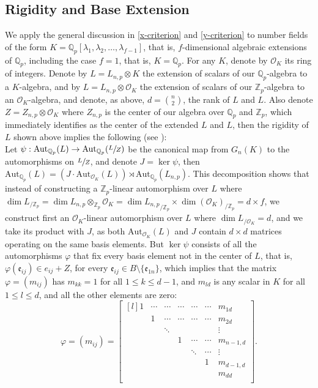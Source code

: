 \documentclass{article}
\newcommand{\e}{\mathfrak{e}}
\begin{document}
\subsection{Rigidity and Base Extension}
We apply the general discussion in \ref{x-criterion} and \ref{y-criterion} to number fields of the form $K=\mathbb{Q}_p[\lambda_1,\lambda_2,\dots,\lambda_{f-1}]$, that is, $f$-dimensional algebraic extensions of $\mathbb{Q}_p$, including the case $f=1$, that is, $K=\mathbb{Q}_p$. 
For any $K$, denote by $\mathcal{O}_K$ its ring of integers.
Denote by ${L}={L}_{n,p}\otimes{K}$ the extension of scalars of our $\mathbb{Q}_p$-algebra to a $K$-algebra, and by $L=L_{n,p}\otimes\mathcal{O}_K$ the extension of scalars of our $\mathbb{Z}_p$-algebra to an $\mathcal{O}_K$-algebra, and denote, as above, $d=\binom{n}{2}$, the rank of ${L}$ and $L$. 
Also denote $Z=Z_{n,p}\otimes\mathcal{O}_K$ where $Z_{n,p}$ is the center of our algebra over $\mathbb{Q}_p$ and $\mathbb{Z}_p$, which immediately identifies as the center of the extended ${L}$ and $L$, then the rigidity of $L$ shown above implies the following (see \cite[\S{3.7}]{BermanGlazerSchein}):\\
Let $\psi:\text{Aut}_{\mathbb{Q}_p}(L)\rightarrow\text{Aut}_{\mathbb{Q}_p}(\sfrac{L}{Z})$ be the canonical map from $G_n(K)$ to the automorphisms on $\sfrac{L}{Z}$, and denote $J=\ker\psi$, then $\text{Aut}_{\mathbb{Q}_p}(L)=(J\cdot\text{Aut}_{\mathcal{O}_K}(L))\rtimes\text{Aut}_{\mathbb{Q}_p}(L_{n,p})$. This decomposition shows that instead of constructing a $\mathbb{Z}_p$-linear automorphism over $L$ where $\dim{L}_{/\mathbb{Z}_p}=\dim{L}_{n,p}\otimes_{\mathbb{Z}_p}\mathcal{O}_K=\dim{{L}_{n,p}}_{/\mathbb{Z}_p}\times\dim(\mathcal{O}_K)_{/\mathbb{Z}_p}=d\times{f}$, we construct first an $\mathcal{O}_K$-linear automorphism over $L$ where $\dim{L}_{/\mathcal{O}_K}=d$, and we take its product with $J$, as both $\text{Aut}_{\mathcal{O}_K}(L)$ and $J$ contain $d\times{d}$ matrices operating on the same basis elements.
But $\ker\psi$ consists of all the automorphisms $\varphi$ that fix every basis element not in the center of $L$, that is, $\varphi(\e_{ij})\in{e}_{ij}+Z$, for every $\e_{ij}\in{B}\setminus\{\e_{1n}\}$, which implies that
the matrix $\varphi=(m_{ij})$ has $m_{kk}=1$ for all $1\leq{k}\leq{d-1}$, and $m_{ld}$ is any scalar in $K$ for all $1\leq{l}\leq{d}$, and all the other elements are zero:
\[
\varphi=(m_{ij})=\begin{bmatrix*}[l]
1&\cdots&\cdots&\cdots&\cdots&\cdots&m_{1d}\\
&1&\cdots&\cdots&\cdots&\cdots&m_{2d}\\
&&\ddots&&&&\vdots\\
&&&1&\cdots&\cdots&m_{n-1,d}\\
&&&&\ddots&\cdots&\vdots\\
&&&&&1&m_{d-1,d}\\
&&&&&&m_{dd}\\
\end{bmatrix*}.\]
\end{document}

